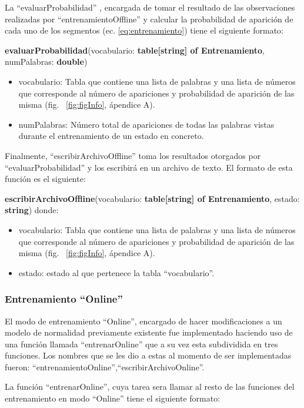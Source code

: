 La ``evaluarProbabilidad'' , encargada de tomar el resultado de las observaciones realizadas por ``entrenamientoOffline'' y calcular la probabilidad de aparición de cada uno de los segmentos (ec. \ref{eq:entrenamiento}) tiene el siguiente formato:

\textbf{evaluarProbabilidad}(vocabulario: \textbf{table[string] of Entrenamiento},
numPalabras: \textbf{double})
\begin{itemize}
\item vocabulario: Tabla que contiene una lista de palabras y una lista de
números que corresponde al número de apariciones y probabilidad de
aparición de las misma (fig. ~\ref{fig:figInfo}, ápendice A).
\item numPalabras: Número total de apariciones de todas las palabras vistas durante el entrenamiento de un estado en concreto.
\end{itemize}

Finalmente, ``escribirArchivoOffline'' toma los resultados otorgados por
``evaluarProbabilidad'' y los escribirá en un archivo de texto. El formato de
esta función es el siguiente:

\textbf{escribirArchivoOffline}(vocabulario: \textbf{table[string] of Entrenamiento}, estado: \textbf{string})
donde:
\begin{itemize}
\item vocabulario: Tabla que contiene una lista de palabras y una lista de
números que corresponde al número de apariciones y probabilidad de
aparición de las misma (fig. ~\ref{fig:figInfo}, ápendice A).
\item estado: estado al que pertenece la tabla ``vocabulario''.
\end{itemize}

\subsubsection{Entrenamiento ``Online''}

El modo de entrenamiento ``Online'', encargado de hacer modificaciones a un modelo de normalidad previamente existente fue implementado
haciendo uso de una función llamada ``entrenarOnline'' que a su vez esta
subdividida en tres funciones. Los
nombres que se les dio a estas al momento de ser implementadas fueron:
``entrenamientoOnline'',``escribirArchivoOnline''.

La función ``entrenarOnline'', cuya tarea sera llamar al resto de las funciones del entrenamiento en modo ``Online'' tiene el siguiente formato:

